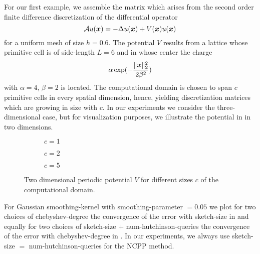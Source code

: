 For our first example, we assemble the matrix which arises from the second order
finite difference discretization of the differential operator
\begin{equation}
    \mathcal{A} u(\boldsymbol{x}) = - \Delta u(\boldsymbol{x}) + V(\boldsymbol{x}) u(\boldsymbol{x})
    \label{equ:5-experiments-electronic-hamiltonian}
\end{equation}
for a uniform mesh of size $h=0.6$. The potential $V$ results from a
lattice whose primitive cell is of side-length $L=6$ and in whose center the
charge
\begin{equation}
    \alpha \exp(-\frac{\lVert \boldsymbol{x} \rVert _2^2}{ 2 \beta^2 })
    \label{equ:5-experiments-gaussian-cell}
\end{equation}
with $\alpha = 4$, $\beta = 2$ is located. The computational domain is chosen
to span $c$ primitive cells in every spatial dimension, hence, yielding
discretization matrices which are growing in size with $c$. In our experiments
we consider the three-dimensional case, but for visualization purposes, we
illustrate the potential in 
in two dimensions.\\

\begin{figure}[ht]
    \begin{subfigure}[b]{0.32\columnwidth}
        
        \caption{$c=1$}
        \label{fig:5-experiments-periodic-gaussian-well-1}
    \end{subfigure}
    \begin{subfigure}[b]{0.32\columnwidth}
        
        \caption{$c=2$}
        \label{fig:5-experiments-periodic-gaussian-well-2}
    \end{subfigure}
    \begin{subfigure}[b]{0.32\columnwidth}
        
        \caption{$c=5$}
        \label{fig:5-experiments-periodic-gaussian-well-5}
    \end{subfigure}
    \caption{Two dimensional periodic potential $V$ for different sizes $c$ of the computational domain.}
    \label{fig:5-experiments-periodic-gaussian-well}
\end{figure}

For Gaussian \gls{smoothing-kernel} 
with \gls{smoothing-parameter} $=0.05$ we plot for two choices of \gls{chebyshev-degree}
the convergence of the error with \gls{sketch-size} in 
and equally for two choices of \gls{sketch-size} $+$ \gls{num-hutchinson-queries} the convergence of the
error with \gls{chebyshev-degree} in .
In our experiments, we always use \gls{sketch-size} $=$ \gls{num-hutchinson-queries} for
the \gls{NCPP} method.\\

